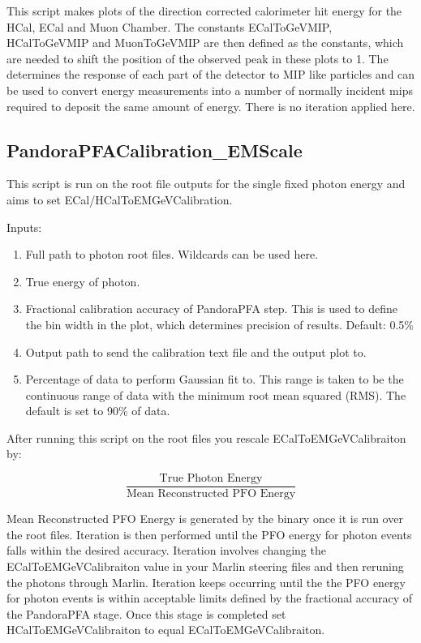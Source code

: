 \documentclass[11pt, oneside]{article}   	%
\begin{document}
This script makes plots of the direction corrected calorimeter hit energy for the HCal, ECal and Muon Chamber.  The constants ECalToGeVMIP, HCalToGeVMIP and MuonToGeVMIP are then defined as the constants, which are needed to shift the position of the observed peak in these plots to 1.  The determines the response of each part of the detector to MIP like particles and can be used to convert energy measurements into a number of normally incident mips required to deposit the same amount of energy.  There is no iteration applied here.

\subsection{PandoraPFACalibration\_EMScale}

This script is run on the root file outputs for the single fixed photon energy and aims to set ECal/HCalToEMGeVCalibration.

Inputs:
\begin{enumerate}
\item Full path to photon root files.  Wildcards can be used here.
\item True energy of photon.
\item Fractional calibration accuracy of PandoraPFA step.  This is used to define the bin width in the plot, which determines precision of results.  Default: 0.5\%
\item Output path to send the calibration text file and the output plot to.
\item Percentage of data to perform Gaussian fit to.  This range is taken to be the continuous range of data with the minimum root mean squared (RMS).  The default is set to 90\% of data.
\end{enumerate}

After running this script on the root files you rescale ECalToEMGeVCalibraiton by:

\begin{equation}
\frac{\text{True Photon Energy}}{\text{Mean Reconstructed PFO Energy}}
\end{equation}

Mean Reconstructed PFO Energy is generated by the binary once it is run over the root files.  Iteration is then performed until the PFO energy for photon events falls within the desired accuracy.  Iteration involves changing the ECalToEMGeVCalibraiton value in your Marlin steering files and then reruning the photons through Marlin.  Iteration keeps occurring until the the PFO energy for photon events is within acceptable limits defined by the fractional accuracy of the PandoraPFA stage.  Once this stage is completed set HCalToEMGeVCalibraiton to equal ECalToEMGeVCalibraiton.
\end{document}
